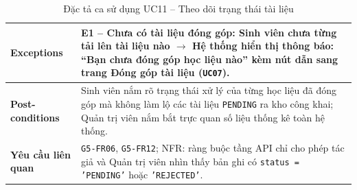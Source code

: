 \begin{table}[H]
\begin{tabularx}{\textwidth}{|p{3.5cm}|X|}
\hline
\textbf{Exceptions} & E1 -- Chưa có tài liệu đóng góp: Sinh viên chưa từng tải lên tài liệu nào $\rightarrow$ Hệ thống hiển thị thông báo: ``Bạn chưa đóng góp học liệu nào'' kèm nút dẫn sang trang Đóng góp tài liệu (\texttt{UC07}). \\
\hline
\textbf{Post-conditions} & Sinh viên nắm rõ trạng thái xử lý của từng học liệu đã đóng góp mà không làm lộ các tài liệu \texttt{PENDING} ra kho công khai; Quản trị viên nắm bắt trực quan số liệu thống kê toàn hệ thống. \\
\hline
\textbf{Yêu cầu liên quan} & \texttt{G5-FR06}, \texttt{G5-FR12}; NFR: ràng buộc tầng API chỉ cho phép tác giả và Quản trị viên nhìn thấy bản ghi có \texttt{status = 'PENDING'} hoặc \texttt{'REJECTED'}. \\
\hline
\end{tabularx}
\caption{Đặc tả ca sử dụng UC11 -- Theo dõi trạng thái tài liệu}
\label{tab:uc11}
\end{table}

